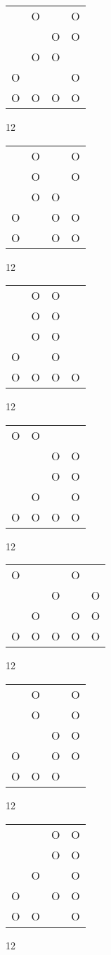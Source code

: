 \begin{tabular}{|m{0.2cm}m{0.2cm}m{0.2cm}m{0.2cm}|}\hline
 &O& &O\\
 & &O&O\\
 &O&O& \\
O& & &O\\
O&O&O&O\\
\hline\end{tabular}12
\begin{tabular}{|m{0.2cm}m{0.2cm}m{0.2cm}m{0.2cm}|}\hline
 &O& &O\\
 &O& &O\\
 &O&O& \\
O& &O&O\\
O& &O&O\\
\hline\end{tabular}12
\begin{tabular}{|m{0.2cm}m{0.2cm}m{0.2cm}m{0.2cm}|}\hline
 &O&O& \\
 &O&O& \\
 &O&O& \\
O& &O& \\
O&O&O&O\\
\hline\end{tabular}12
\begin{tabular}{|m{0.2cm}m{0.2cm}m{0.2cm}m{0.2cm}|}\hline
O&O& & \\
 & &O&O\\
 & &O&O\\
 &O& &O\\
O&O&O&O\\
\hline\end{tabular}12
\begin{tabular}{|m{0.2cm}m{0.2cm}m{0.2cm}m{0.2cm}m{0.2cm}|}\hline
O& & &O& \\
 & &O& &O\\
 &O& &O&O\\
O&O&O&O&O\\
\hline\end{tabular}12
\begin{tabular}{|m{0.2cm}m{0.2cm}m{0.2cm}m{0.2cm}|}\hline
 &O& &O\\
 &O& &O\\
 & &O&O\\
O& &O&O\\
O&O&O& \\
\hline\end{tabular}12
\begin{tabular}{|m{0.2cm}m{0.2cm}m{0.2cm}m{0.2cm}|}\hline
 & &O&O\\
 & &O&O\\
 &O& &O\\
O& &O&O\\
O&O& &O\\
\hline\end{tabular}12
